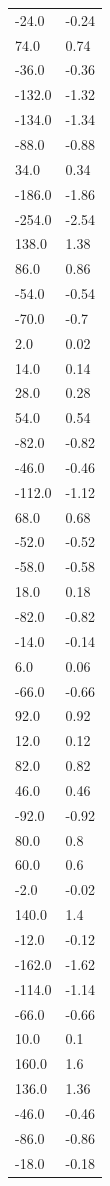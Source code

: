 \begin{longtable}{ll}
-24.0 & -0.24 \\
74.0 & 0.74 \\
-36.0 & -0.36 \\
-132.0 & -1.32 \\
-134.0 & -1.34 \\
-88.0 & -0.88 \\
34.0 & 0.34 \\
-186.0 & -1.86 \\
-254.0 & -2.54 \\
138.0 & 1.38 \\
86.0 & 0.86 \\
-54.0 & -0.54 \\
-70.0 & -0.7 \\
2.0 & 0.02 \\
14.0 & 0.14 \\
28.0 & 0.28 \\
54.0 & 0.54 \\
-82.0 & -0.82 \\
-46.0 & -0.46 \\
-112.0 & -1.12 \\
68.0 & 0.68 \\
-52.0 & -0.52 \\
-58.0 & -0.58 \\
18.0 & 0.18 \\
-82.0 & -0.82 \\
-14.0 & -0.14 \\
6.0 & 0.06 \\
-66.0 & -0.66 \\
92.0 & 0.92 \\
12.0 & 0.12 \\
82.0 & 0.82 \\
46.0 & 0.46 \\
-92.0 & -0.92 \\
80.0 & 0.8 \\
60.0 & 0.6 \\
-2.0 & -0.02 \\
140.0 & 1.4 \\
-12.0 & -0.12 \\
-162.0 & -1.62 \\
-114.0 & -1.14 \\
-66.0 & -0.66 \\
10.0 & 0.1 \\
160.0 & 1.6 \\
136.0 & 1.36 \\
-46.0 & -0.46 \\
-86.0 & -0.86 \\
-18.0 & -0.18 \\

\end{longtable}
